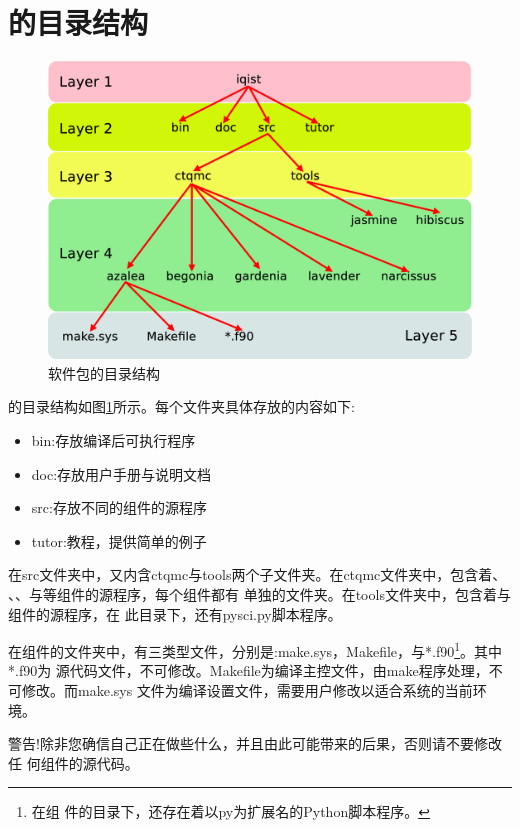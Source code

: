 \section{{\iqist}的目录结构}
\label{sec:directory}

\begin{figure}
\centering
\includegraphics[scale=0.28]{figure/dir.eps}
\caption{{\iqist}软件包的目录结构\label{fig:dir}}
\end{figure}

{\iqist}的目录结构如图\ref{fig:dir}所示。每个文件夹具体存放的内容如下:
\begin{itemize}
\item bin:存放编译后可执行程序
\item doc:存放用户手册与说明文档
\item src:存放不同的组件的源程序
\item tutor:教程，提供简单的例子
\end{itemize}

在src文件夹中，又内含ctqmc与tools两个子文件夹。在ctqmc文件夹中，包含着{\azalea}、
{\gardenia}、{\narcissus}、{\begonia}与{\lavender}等组件的源程序，每个组件都有
单独的文件夹。在tools文件夹中，包含着{\jasmine}与{\hibiscus}组件的源程序，在
此目录下，还有pysci.py脚本程序。

在组件的文件夹中，有三类型文件，分别是:make.sys，Makefile，与*.f90\footnote{在{\hibiscus}组
件的目录下，还存在着以py为扩展名的Python脚本程序。}。其中*.f90为
源代码文件，不可修改。Makefile为编译主控文件，由make程序处理，不可修改。而make.sys
文件为编译设置文件，需要用户修改以适合系统的当前环境。

警告!除非您确信自己正在做些什么，并且由此可能带来的后果，否则请不要修改任
何{\iqist}组件的源代码。

